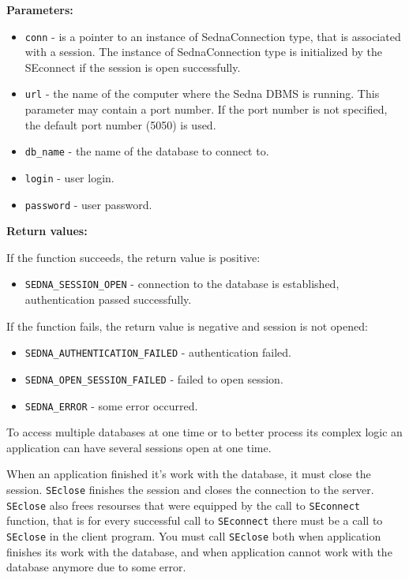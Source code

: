 \documentclass[a4paper,12pt]{article}
\newenvironment{citemize}
{\begin{itemize}
  \setlength{\itemsep}{0pt}
  \setlength{\parskip}{0pt}
  \setlength{\parsep}{0pt}}
{\end{itemize}}
\begin{document}
\noindent
\textbf{Parameters:}

\begin{citemize}
\item\verb!conn! - is a pointer to an instance of SednaConnection type, that is
associated with a session. The instance of SednaConnection type is initialized
by the SEconnect if the session is open successfully.
\item\verb!url! - the name of the computer where the Sedna DBMS is running. This
parameter may contain a port number. If the port number is not specified, the
default port number (5050) is used.
\item\verb!db_name! - the name of the database to connect to.
\item\verb!login! - user login.
\item\verb!password! - user password.
\end{citemize}

\noindent
\textbf{Return values:}

\medskip

\noindent
If the function succeeds, the return value is positive:

\begin{citemize}
\item\verb!SEDNA_SESSION_OPEN! - connection to the database is established,
authentication passed successfully.
\end{citemize}

\noindent
If the function fails, the return value is negative and session is not opened:

\begin{citemize}
\item\verb!SEDNA_AUTHENTICATION_FAILED! - authentication failed.
\item\verb!SEDNA_OPEN_SESSION_FAILED! - failed to open session.
\item\verb!SEDNA_ERROR! - some error occurred.
\end{citemize}

To access multiple databases at one time or to better process its complex logic
an application can have several sessions open at one time.

When an application finished it's work with the database, it must close the
session. \verb!SEclose! finishes the session and closes the connection to the
server. \verb!SEclose! also frees resourses that were equipped by the call to
\verb!SEconnect! function, that is for every successful call to \verb!SEconnect!
there must be a call to \verb!SEclose! in the client program. You must call
\verb!SEclose! both when application finishes its work with the database, and
when application cannot work with the database anymore due to some error.
\end{document}
